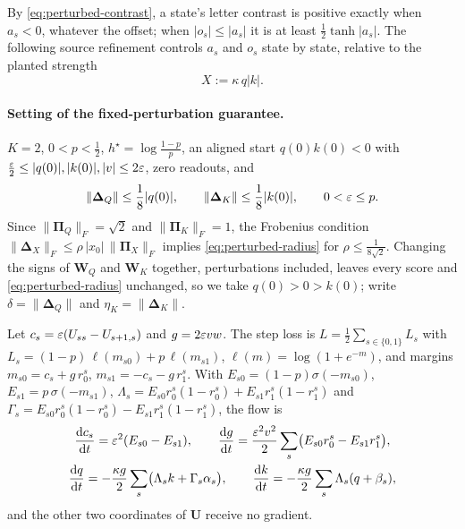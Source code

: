 By \cref{eq:perturbed-contrast}, a state's letter contrast is positive exactly when $a_s<0$, whatever the offset; when $|o_s|\le|a_s|$ it is at
least $\frac12\tanh|a_s|$. The following source refinement controls $a_s$ and $o_s$ state by state, relative to the planted strength
\[
 X:=\kappa\,q|k|.
\]

\paragraph{Setting of the fixed-perturbation guarantee.} $K=2$, $0<p<\frac12$, $h^\star=\log\frac{1-p}{p}$, an aligned start $q(0)k(0)<0$ with
$\frac{\varepsilon}{2}\le|q(0)|,|k(0)|,|v|\le2\varepsilon$, zero readouts, and
\begin{equation}
 \|\bm\Delta_Q\|\le\tfrac18|q(0)|,\qquad \|\bm\Delta_K\|\le\tfrac18|k(0)|,\qquad 0<\initscale\le p .
 \label{eq:perturbed-radius}
\end{equation}
Since $\|\bm\Pi_Q\|_F=\sqrt2$ and $\|\bm\Pi_K\|_F=1$, the Frobenius condition $\|\bm\Delta_X\|_F\le\rho\,|x_0|\,\|\bm\Pi_X\|_F$ implies
\cref{eq:perturbed-radius} for $\rho\le\frac{1}{8\sqrt2}$. Changing the signs of $\mathbf W_Q$ and $\mathbf W_K$ together, perturbations included, leaves every score
and \cref{eq:perturbed-radius} unchanged, so we take $q(0)>0>k(0)$; write $\delta=\|\bm\Delta_Q\|$ and $\eta_K=\|\bm\Delta_K\|$.

\begin{lemma}[Reduced flow for $K=2$]
\label{lem:perturbed-reduce}
Let $c_s=\varepsilon(U_{ss}-U_{s+1,s})$ and $g=2\varepsilon vw$. The step loss is
$L=\frac12\sum_{s\in\{0,1\}}L_s$ with $L_s=(1-p)\,\ell(m_{s0})+p\,\ell(m_{s1})$, $\ell(m)=\log(1+e^{-m})$, and margins
$m_{s0}=c_s+g\,r^s_0$, $m_{s1}=-c_s-g\,r^s_1$. With $E_{s0}=(1-p)\sigma(-m_{s0})$, $E_{s1}=p\,\sigma(-m_{s1})$,
$\Lambda_s=E_{s0}r^s_0(1-r^s_0)+E_{s1}r^s_1(1-r^s_1)$ and $\Gamma_s=E_{s0}r^s_0(1-r^s_0)-E_{s1}r^s_1(1-r^s_1)$, the flow is
\begin{gather*}
 \ddt{c_s}=\initscale^2(E_{s0}-E_{s1}),\qquad \ddt{g}=\frac{\initscale^2v^2}{2}\sum_s\bigl(E_{s0}r^s_0-E_{s1}r^s_1\bigr),\\
 \ddt{q}=-\frac{\kappa g}{2}\sum_s\bigl(\Lambda_sk+\Gamma_s\alpha_s\bigr),\qquad \ddt{k}=-\frac{\kappa g}{2}\sum_s\Lambda_s(q+\beta_s),
\end{gather*}
and the other two coordinates of $\mathbf U$ receive no gradient.
\end{lemma}

